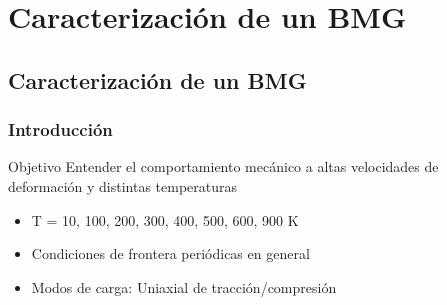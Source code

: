 
\section[Caracterizaci\'on]{Caracterizaci\'on de un BMG}
\subsection{Caracterizaci\'on de un BMG}

\begin{frame}
    \frametitle{Introducci\'on}
    \vspace{0.2cm}
    \begin{block}{Objetivo}
     Entender el comportamiento mec\'anico a altas velocidades de deformaci\'on y distintas temperaturas
    \end{block}
    \vspace{1cm}
    \begin{itemize}
     \item T = 10, 100, 200, 300, 400, 500, 600, 900 K
     \item Condiciones de frontera periódicas en general
     \item Modos de carga: Uniaxial de tracción/compresión
    \end{itemize}

\end{frame}

